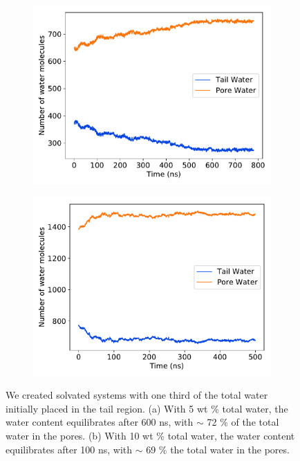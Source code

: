 \documentclass{article}
\begin{document}
  \begin{figure}
  \centering
  \begin{subfigure}{0.45\textwidth}
  \includegraphics[width=\textwidth]{5wt_offset_equil.pdf}
  \caption{}\label{fig:5wt_offset_equil}
  \end{subfigure}
  \begin{subfigure}{0.45\textwidth}
  \includegraphics[width=\textwidth]{10wt_offset_equil.pdf}
  \caption{}\label{fig:10wt_offset_equil}
  \end{subfigure}
  \caption{We created solvated systems with one third of the total water
	  initially placed in the tail region. (a) With 5 wt \% total water, the water
	  content equilibrates after 600 ns, with $\sim$ 72 \% of the total water in the
	  pores. (b) With 10 wt \% total water, the water content equilibrates after 100
	  ns, with $\sim$ 69 \% the total water in the
	  pores.}\label{fig:solvation_equilibration}
  \end{figure}
\end{document}
